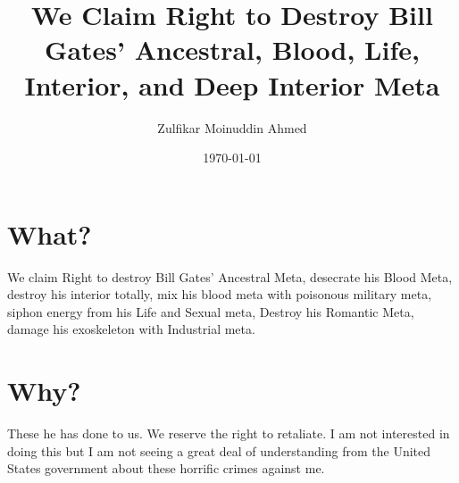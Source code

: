 \documentclass{amsart}
\title{We Claim Right to Destroy Bill Gates' Ancestral, Blood, Life, Interior, and Deep Interior Meta}
\author{Zulfikar Moinuddin Ahmed}
\date{\today}
\begin{document}
\maketitle

\section{What?}

We claim Right to destroy Bill Gates' Ancestral Meta, desecrate his Blood Meta, destroy his interior totally, mix his blood meta with poisonous military meta, siphon energy from his Life and Sexual meta, Destroy his Romantic Meta, damage his exoskeleton with Industrial meta.

\section{Why?}

These he has done to us.  We reserve the right to retaliate.  I am not interested in doing this but I am not seeing a great deal of understanding from the United States government about these horrific crimes against me.
\end{document}
